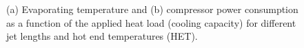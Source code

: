 \documentclass[review,preprint,12pt]{elsarticle}
\begin{document}
\begin{figure}[!htp]
\centering
{}
\hfil
{}
\caption{(a) Evaporating temperature and (b) compressor power consumption as a function of the applied heat load (cooling capacity) for different jet lengths and hot end temperatures (HET).}
\label{fig:Figure_13}
\end{figure}
\end{document}
